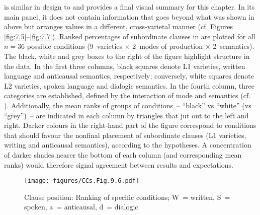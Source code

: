 is similar in design to  and provides a final visual summary for this chapter. In its main panel, it does not contain information that goes beyond what was shown in  above but arranges values in a different, cross-varietal manner (cf. Figures \ref{fig:7.5}–\ref{fig:7.7}). Ranked percentages of subordinate clauses in  are plotted for all $n=36$ possible conditions (9~varieties × 2~modes of production × 2~semantics). The black, white and grey boxes to the right of the figure highlight structure in the data. In the first three columns, black squares denote L1 varieties, written language and anticausal semantics, respectively; conversely, white squares denote L2 varieties, spoken language and dialogic semantics. In the fourth column, three categories are established, defined by the interaction of mode and semantics (cf. ). Additionally, the mean ranks of groups of conditions~– “black” vs “white” (vs “grey”)~– are indicated in each column by triangles that jut out to the left and right. Darker colours in the right-hand part of the figure correspond to conditions that should favour the nonfinal placement of subordinate clauses (L1 varieties, writing and anticausal semantics), according to the hypotheses. A concentration of darker shades nearer the bottom of each column (and corresponding mean ranks) would therefore signal agreement between results and expectations.

\begin{figure}
\texttt{[image: figures/CCs.Fig.9.6.pdf]}
\caption{\label{bkm:Ref51234537}\label{fig:9.6}Clause position: Ranking of specific conditions; W~= written, S~= spoken, a~= anticausal, d~= dialogic}
\end{figure}

